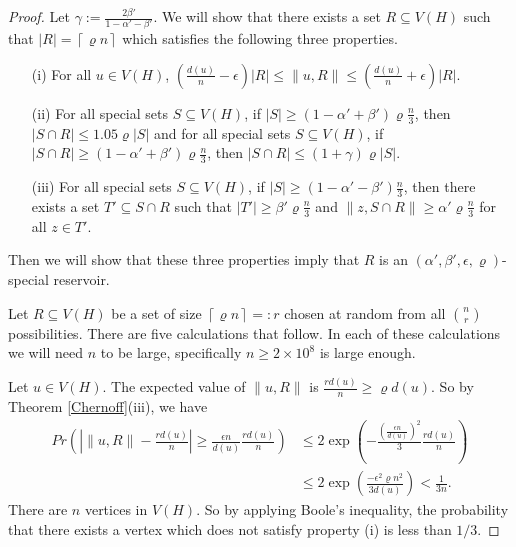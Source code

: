 \documentclass[oneside,12pt]{memoir}
\newcommand{\ep}{\epsilon}
\newcommand{\ceiling}[1]{\left\lceil#1\right\rceil}
\newcommand{\n}{2\times 10^8}
\begin{document}
\begin{proof}
Let $\gamma:=\frac{2\beta'}{1-\alpha'-\beta'}$. We will show that there
exists a set $R\subseteq V(H)$ such that $|R|=\ceiling{\varrho n}$ which satisfies the following three
properties.
\begin{enumerate}
\item[(i)] For all $u\in V(H)$, $\left(\frac{d(u)}{n}-\ep\right)|R|\leq\|u,R\|\leq\left(\frac{d(u)}{n}+\ep\right)|R|$.
\item[(ii)] For all special sets $S\subseteq V(H)$, if $|S|\geq(1-\alpha'+\beta')\varrho\frac{ n}{3}$, then %
$|S\cap R|\leq 1.05\varrho|S|$ and for all special sets $S\subseteq V(H)$, if $|S\cap R|\geq(1-\alpha'+\beta')\varrho\frac{ n}{3}$, then $|S\cap R|\leq (1+\gamma)\varrho|S|$.
\item[(iii)] For all special sets $S\subseteq V(H)$, if $|S|\geq(1-\alpha'-\beta')\frac{n}{3}$, then 
there exists a set $T'\subseteq S\cap R$ such that $|T'|\geq \beta'\varrho\frac{n}{3}$
and $\|z,S\cap R\|\geq \alpha'\varrho\frac{n}{3}$ for all $z\in T'$. \end{enumerate}
Then we will show that these three properties imply that $R$ is an 
$(\alpha', \beta', \ep, \varrho)$-special reservoir.

Let $R\subseteq V(H)$ be a set of size $\ceiling{\varrho n}=:r$ chosen
at random from all $\binom{n}{r}$ possibilities. There are five calculations that follow.  In each of these calculations we will need $n$ to be large, specifically $n\geq \n$ is large enough.

Let $u\in V(H)$. The expected value of $\|u,R\|$ is $\frac{rd(u)}{n}\geq\varrho d(u)$.
So by Theorem \ref{Chernoff}(iii), we have \begin{align*}
Pr\left(\left|\|u,R\|-\frac{rd(u)}{n}\right|\geq\frac{\ep n}{d(u)}\frac{rd(u)}{n}\right)&\leq 2\exp\left(-\frac{(\frac{\ep n}{d(u)})^{2}}{3}\frac{rd(u)}{n}\right)\\
&\leq2\exp\left(\frac{-\ep^{2}\varrho n^2}{3d(u)}\right)<\frac{1}{3n}.\end{align*}
There are $n$ vertices in $V(H)$. So by applying Boole's inequality, the probability that there exists a vertex which does not satisfy property (i) is less than $1/3$.


\end{proof}
\end{document}
